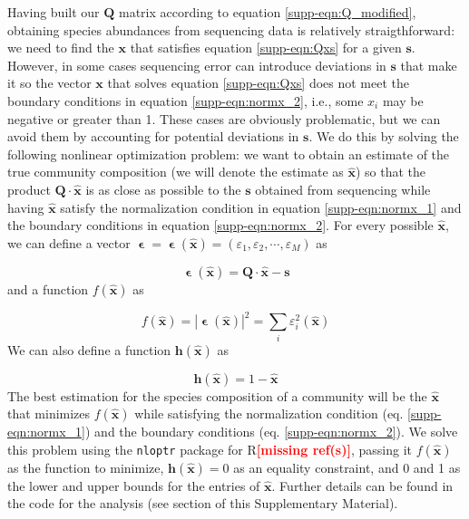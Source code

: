 \documentclass[a4paper,10pt]{article}
\newcommand{\mr}{\textcolor{red}{\textbf{[missing ref(s)]}}}
\begin{document}
Having built our $\mathbf{Q}$ matrix according to equation
\ref{supp-eqn:Q_modified}, obtaining species abundances from sequencing data
is relatively straigthforward: we need to find the $\mathbf{x}$ that satisfies
equation \ref{supp-eqn:Qxs} for a given $\mathbf{s}$. However, in some cases
sequencing error can introduce deviations in $\mathbf{s}$ that make it so the
vector $\mathbf{x}$ that solves equation \ref{supp-eqn:Qxs} does not meet the
boundary conditions in equation \ref{supp-eqn:normx_2}, i.e., some $x_i$ may be
negative or greater than 1. These cases are obviously problematic, but we can
avoid them by accounting for potential deviations in $\mathbf{s}$. We do this
by solving the following nonlinear optimization problem: we want to obtain an
estimate of the true community composition
(we will denote the estimate as $\mathbf{\hat{x}}$) so that the product
$\mathbf{Q} \cdot \mathbf{\hat{x}}$ is as close as possible to the $\mathbf{s}$
obtained from sequencing while
having $\mathbf{\hat{x}}$ satisfy the normalization condition in equation
\ref{supp-eqn:normx_1} and the boundary conditions in equation
\ref{supp-eqn:normx_2}. For every possible $\mathbf{\hat{x}}$, we can define a vector
$\boldsymbol{\upvarepsilon} = \boldsymbol{\upvarepsilon} \left( \mathbf{\hat{x}} \right) = 
\left( \varepsilon_1, \varepsilon_2, \cdots, \varepsilon_M \right)$ as

\begin{equation}
\boldsymbol{\upvarepsilon} \left( \mathbf{\hat{x}} \right) =
\mathbf{Q} \cdot \mathbf{\hat{x}} - \mathbf{s}
\end{equation}
%
and a function $f \left( \mathbf{\hat{x}} \right)$ as

\begin{equation}
f \left( \mathbf{\hat{x}} \right) =
\left| \boldsymbol{\upvarepsilon} \left( \mathbf{\hat{x}} \right) \right| ^2 =
\sum_i \varepsilon_i^2 \left( \mathbf{\hat{x}} \right)
\end{equation}
%
We can also define a function $\mathbf{h} \left( \mathbf{\hat{x}} \right)$ as

\begin{equation}
\mathbf{h} \left( \mathbf{\hat{x}} \right) = 1 - \mathbf{\hat{x}}
\end{equation}
%
The best estimation for the species composition of a community will be the
$\mathbf{\hat{x}}$ that minimizes $f \left( \mathbf{\hat{x}} \right)$ while
satisfying the normalization condition (eq. \ref{supp-eqn:normx_1}) and the
boundary conditions (eq. \ref{supp-eqn:normx_2}). We solve
this problem using the \texttt{nloptr} package for R\mr, passing it
$f \left( \mathbf{\hat{x}} \right)$ as the function to minimize,
$\mathbf{h} \left( \mathbf{\hat{x}} \right) = 0$ as an equality constraint,
and 0 and 1
as the lower and upper bounds for the entries of $\mathbf{\hat{x}}$. Further
details can be found in the code for the analysis (see section 
 of this Supplementary Material).
\end{document}
